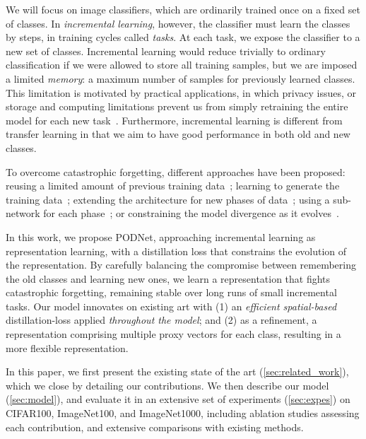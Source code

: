 We will focus on image classifiers, which are ordinarily trained once on a fixed set of classes. In
\textit{incremental learning}, however, the classifier must learn the classes by steps, in training
cycles called \textit{tasks}. At each task, we expose the classifier to a new set of classes.
Incremental learning would reduce trivially to ordinary classification if we were allowed to store
all training samples, but we are imposed a limited \textit{memory}: a maximum number of samples for
previously learned classes. This limitation is motivated by practical applications, in which privacy
issues, or storage and computing limitations prevent us from simply retraining the entire model for
each new task~\citep{li2018lwf,lomonaco2017core50}. Furthermore, incremental learning is different
from transfer learning in that we aim to have good performance in both old and new classes.

To overcome catastrophic forgetting, different approaches have been proposed: reusing a limited
amount of previous training data~\citep{rebuffi2017icarl,castro2018end_to_end_inc_learn}; learning
to generate the training data~\citep{kemker2018fearnet,shin2017deep_generative_replay}; extending
the architecture for new phases of
data~\citep{yoon2018dynamically_expandable_networks,li2019learning_to_grow}; using a sub-network for
each phase~\citep{fernando2017path_net,golkar2019neural_pruning}; or constraining the model
divergence as it
evolves~\citep{kirkpatrick2017ewc,lopezpaz2017gem,aljundi2018MemoryAwareSynapses,li2018lwf,rebuffi2017icarl,castro2018end_to_end_inc_learn}.


In this work, we propose PODNet, approaching incremental learning as representation learning, with a
distillation loss that constrains the evolution of the representation. By carefully balancing the
compromise between remembering the old classes and learning new ones, we learn a representation that
fights catastrophic forgetting, remaining stable over long runs of small incremental tasks. Our
model innovates on existing art with (1) an \textit{efficient spatial-based} distillation-loss
applied \textit{throughout the model}; and (2) as a refinement, a representation comprising multiple
proxy vectors for each class, resulting in a more flexible representation.

In this paper, we first present the existing state of the art (\autoref{sec:related_work}), which we
close by detailing our contributions. We then describe our model (\autoref{sec:model}), and evaluate
it in an extensive set of experiments (\autoref{sec:expes}) on CIFAR100, ImageNet100, and
ImageNet1000, including ablation studies assessing each contribution, and extensive comparisons with
existing methods.

